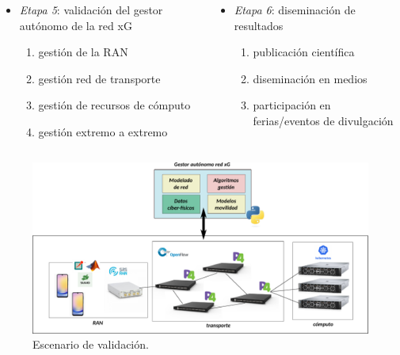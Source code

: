 \documentclass[xcolor=table,xcolor=x11names]{beamer}
\begin{document}
\begin{frame}{\subsecname}

    \begin{columns}[T] %
        \begin{column}{.48\textwidth}



            \begin{itemize}
                \item \emph{Etapa 5}: validación del
                    gestor autónomo de la red xG
                    \begin{enumerate}
                        \item gestión de la RAN
                        \item gestión red de transporte
                        \item gestión de recursos de cómputo
                        \item gestión extremo a extremo
                    \end{enumerate}
            \end{itemize}




        \end{column}
        \begin{column}{.48\textwidth}
            \begin{itemize}
                \item \emph{Etapa 6}: diseminación de
                    resultados
                \begin{enumerate}
                    \item publicación científica
                    \item diseminación en medios
                    \item participación en ferias/eventos
                        de divulgación
                \end{enumerate}
            \end{itemize}
        \end{column}
    \end{columns}
    
    \begin{figure}[t]
        \centering
        \includegraphics[width=.5\textwidth]{figures/validacion.pdf}
        \caption{Escenario de validación.}
    \end{figure}
\end{frame}
\end{document}
